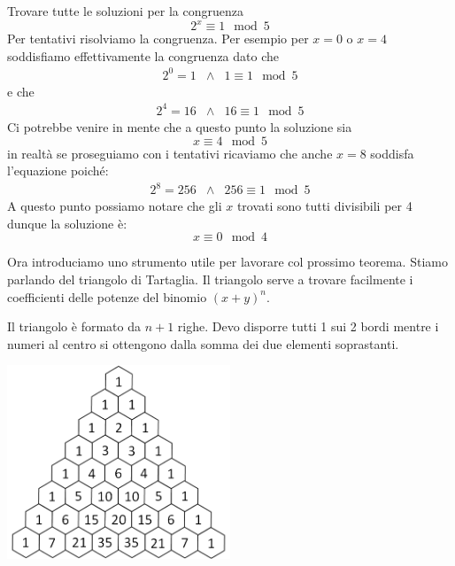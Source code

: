 \begin{example}
	Trovare tutte le soluzioni per la congruenza
	\begin{equation*}
		2^x \equiv 1 \mod{5}
	\end{equation*}
	Per tentativi risolviamo la congruenza. Per esempio per $x = 0$ o $x = 4$ soddisfiamo
	effettivamente la congruenza dato che
	\begin{equation*}
		\begin{array}{ccc}
			2^0 = 1 & \wedge & 1 \equiv 1 \mod{5}
		\end{array}
	\end{equation*}
	e che
	\begin{equation*}
		\begin{array}{ccc}
			2^4 = 16 & \wedge & 16 \equiv 1 \mod{5}
		\end{array}
	\end{equation*}
	Ci potrebbe venire in mente che a questo punto la soluzione sia
	\begin{equation*}
		x \equiv 4 \mod{5}
	\end{equation*}
	in realt\`a se proseguiamo con i tentativi ricaviamo che anche $x = 8$ soddisfa
	l'equazione poich\'e:
	\begin{equation*}
		\begin{array}{ccc}
			2^8 = 256 & \wedge & 256 \equiv 1 \mod{5}
		\end{array}
	\end{equation*}
	A questo punto possiamo notare che gli $x$ trovati sono tutti divisibili per 4
	dunque la soluzione \`e:
	\begin{equation*}
		x \equiv 0 \mod{4}
	\end{equation*}
\end{example}

Ora introduciamo uno strumento utile per lavorare col prossimo teorema. Stiamo parlando del
triangolo di Tartaglia. Il triangolo serve a trovare facilmente i coefficienti delle potenze
del binomio $(x + y)^n$.

Il triangolo \`e formato da $n + 1$ righe. Devo disporre tutti 1 sui 2 bordi mentre i numeri
al centro si ottengono dalla somma dei due elementi soprastanti.

\begin{center}
	\includegraphics[width=0.5\textwidth]{immagini/Tartaglia}
\end{center}

